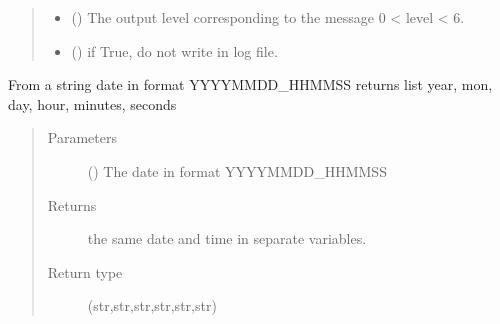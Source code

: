 \documentclass[a4paper,10pt,english]{sphinxmanual}
\begin{document}
\begin{fulllineitems}
\begin{fulllineitems}
\begin{quote}
\begin{description}
\begin{itemize}
\item {} 
 () \textendash{} The output level corresponding 
to the message 0 \textless{} level \textless{} 6.

\item {} 
 () \textendash{} if True, do not write in log file.

\end{itemize}

\end{description}\end{quote}

\end{fulllineitems}


\end{fulllineitems}


\begin{fulllineitems}
\label{\detokenize{commands/apidoc/src:src.logger.date_to_datetime}}
From a string date in format YYYYMMDD\_HHMMSS
returns list year, mon, day, hour, minutes, seconds
\begin{quote}\begin{description}
\item[{Parameters}] \leavevmode
{} () \textendash{} The date in format YYYYMMDD\_HHMMSS

\item[{Returns}] \leavevmode
the same date and time in separate variables.

\item[{Return type}] \leavevmode
(str,str,str,str,str,str)

\end{description}\end{quote}

\end{fulllineitems}

\end{document}
